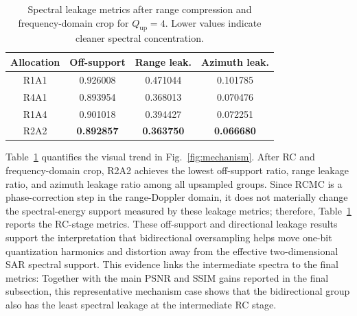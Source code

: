 \documentclass[conference]{IEEEtran}
\begin{document}
\begin{table}[t]
\caption{Spectral leakage metrics after range compression and frequency-domain crop for $Q_{\mathrm{up}}=4$. Lower values indicate cleaner spectral concentration.}
\begin{center}
\scriptsize
\begin{tabular}{c c c c}
\hline
Allocation & Off-support & Range leak. & Azimuth leak. \\
\hline
R1A1 & 0.926008 & 0.471044 & 0.101785 \\
R4A1 & 0.893954 & 0.368013 & 0.070476 \\
R1A4 & 0.901018 & 0.394427 & 0.072251 \\
R2A2 & \textbf{0.892857} & \textbf{0.363750} & \textbf{0.066680} \\
\hline
\end{tabular}
\label{tab:mechanism_metrics}
\end{center}
\end{table}

Table~\ref{tab:mechanism_metrics} quantifies the visual trend in Fig.~\ref{fig:mechanism}. After RC and frequency-domain crop, R2A2 achieves the lowest off-support ratio, range leakage ratio, and azimuth leakage ratio among all upsampled groups. Since RCMC is a phase-correction step in the range-Doppler domain, it does not materially change the spectral-energy support measured by these leakage metrics; therefore, Table~\ref{tab:mechanism_metrics} reports the RC-stage metrics. These off-support and directional leakage results support the interpretation that bidirectional oversampling helps move one-bit quantization harmonics and distortion away from the effective two-dimensional SAR spectral support. This evidence links the intermediate spectra to the final metrics: Together with the main PSNR and SSIM gains reported in the final subsection, this representative mechanism case shows that the bidirectional group also has the least spectral leakage at the intermediate RC stage.
\end{document}
